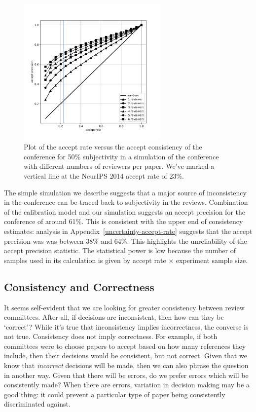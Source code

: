 \documentclass[twoside]{article}
\begin{document}
\begin{figure}[htb]
\centering
\includegraphics[width=0.65\textwidth]{diagrams/neurips/accept-precision-vs-accept-rate.pdf}

\caption{Plot of the accept rate versus the accept consistency of the
  conference for 50\% subjectivity in a simulation of the conference
  with different numbers of reviewers per paper. We've marked a vertical line at the NeurIPS 2014 accept rate of 23\%.}
\label{figure-consistency-vs-accept-rate}
\end{figure}

The simple simulation we describe suggests that a major source of
inconsistency in the conference can be traced back to subjectivity in
the reviews. Combination of the calibration model and our simulation
suggests an accept precision for the conference of around 61\%. This
is consistent with the upper end of consistency estimates: analysis in Appendix~\ref{uncertainty-accept-rate}
suggests that the accept precision was was between 38\% and 64\%. This highlights the
unreliability of the accept precision statistic. The statistical power
is low because the number of samples used in its calculation is given
by accept rate $\times$ experiment sample size.

\subsection{Consistency and Correctness}

It seems self-evident that we are looking for greater consistency between review
committees. After all, if decisions are inconsistent, then how can
they be `correct'? While it's true that inconsistency implies
incorrectness, the converse is not true. Consistency does not imply
correctness. For example, if both committees were to choose papers to
accept based on how many references they include, then their decisions
would be consistent, but not correct. Given that we know that
\emph{incorrect} decisions will be made, then we can also phrase the
question in another way. Given that there will be errors, do we prefer
errors which will be consistently made? When there are errors,
variation in decision making may be a good thing: it could prevent a
particular type of paper being consistently discriminated against.
\end{document}
